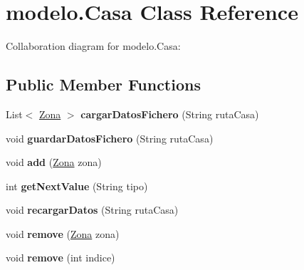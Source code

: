 \hypertarget{classmodelo_1_1_casa}{}\section{modelo.\+Casa Class Reference}
\label{classmodelo_1_1_casa}


Collaboration diagram for modelo.\+Casa\+:
\subsection*{Public Member Functions}
\begin{DoxyCompactItemize}
\item 
\mbox{\label{classmodelo_1_1_casa_af9274bc27190d87445c1738f9521e1de}} 
List$<$ \mbox{\hyperlink{classmodelo_1_1_zona}{Zona}} $>$ {\bfseries cargar\+Datos\+Fichero} (String ruta\+Casa)
\item 
\mbox{\label{classmodelo_1_1_casa_a504a6d0ee469d24256747979729793ae}} 
void {\bfseries guardar\+Datos\+Fichero} (String ruta\+Casa)
\item 
\mbox{\label{classmodelo_1_1_casa_acc00d762e914de9fb2226b936faa6628}} 
void {\bfseries add} (\mbox{\hyperlink{classmodelo_1_1_zona}{Zona}} zona)
\item 
\mbox{\label{classmodelo_1_1_casa_adb043de5db6f7a315518085206568667}} 
int {\bfseries get\+Next\+Value} (String tipo)
\item 
\mbox{\label{classmodelo_1_1_casa_aa739909f439596b93dfbbd899f0ec740}} 
void {\bfseries recargar\+Datos} (String ruta\+Casa)
\item 
\mbox{\label{classmodelo_1_1_casa_acb5c7d204a097018d4fcb24b24b19537}} 
void {\bfseries remove} (\mbox{\hyperlink{classmodelo_1_1_zona}{Zona}} zona)
\item 
\mbox{\label{classmodelo_1_1_casa_af00a9d3d107d6574ff06bff594c3971e}} 
void {\bfseries remove} (int indice)
\item 
\mbox{\label{classmodelo_1_1_casa_a65e195399c3dac20e34b6201c666e97f}} 

\end{DoxyCompactItemize}
